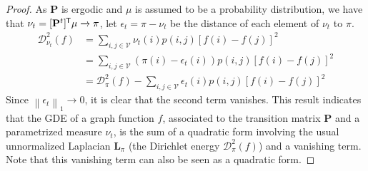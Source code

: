 \documentclass[10pt]{article} %
\def\rmL{{\mathbf{L}}}
\def\rmP{{\mathbf{P}}}
\def\gV{{\mathcal{V}}}
\newcommand{\norm}[1]{\left\lVert#1\right\rVert}
\newcommand{\D}[2]{\mathcal{D}^2_{#1}(#2)}
\renewcommand*{\top}{{\mkern-1.4mu\mathsf{T}}}
\begin{document}
%
\begin{proof}
  As $\rmP$ is ergodic and $\mu$ is assumed to be a probability distribution, we have that $\nu_t = [\rmP^t]^\top \mu \xrightarrow{} \pi$, let $\epsilon_t = \pi - \nu_t$ be the distance of each element of $\nu_t$ to $\pi$.
  \begin{align}
    \D{\nu_t}{f} &= \sum_{i,j\in\gV }\nu_t(i)p(i,j)[f(i)-f(j)]^2 \nonumber \\
                  &= \sum_{i,j\in\gV }(\pi(i) - \epsilon_t(i) )p(i,j)[f(i)-f(j)]^2 \nonumber \\
                  &= \D{\pi}{f} -  \sum_{i,j \in \gV } \epsilon_t(i) p(i,j)[f(i)-f(j)]^2
  \end{align}
  Since $\norm{\epsilon_t}_1 \to 0$, it is clear that the second term vanishes. This result indicates that the GDE of a graph function $f$, associated to the transition matrix $\rmP$ and a parametrized measure $\nu_t$, is the sum of a quadratic form involving the usual unnormalized Laplacian $\rmL_\pi$ (the Dirichlet energy $\D{\pi}{f}$) and a vanishing term. Note that this vanishing term can also be seen as a quadratic form.
\end{proof}
\end{document}
